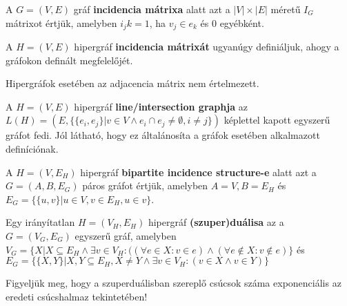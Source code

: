 \begin{definition}
A $G=(V,E)$ gráf \textbf{incidencia mátrixa} alatt azt a $|V| \times |E|$ méretű $I_G$ mátrixot értjük, amelyben $i_jk=1$, ha $v_j \in e_k$ és 0 egyébként.
\end{definition}

\begin{definition}
A $H=(V,E)$ hipergráf \textbf{incidencia mátrixát} ugyanúgy definiáljuk, ahogy a gráfokon definált megfelelőjét.
\end{definition}

\begin{note}
Hipergráfok esetében az adjacencia mátrix nem értelmezett.
\end{note}

\begin{definition}
A $H=(V,E)$ hipergráf \textbf{line/intersection graphja} az $L(H)=(E, \{ \{ e_i, e_j \} | v \in V \land e_i \cap e_j \neq \emptyset, i \neq j \})$ képlettel kapott egyszerű gráfot fedi. Jól látható, hogy ez általánosíta a gráfok esetében alkalmazott definíciónak.
\end{definition}

\begin{definition}
A $H=(V,E_H)$ hipergráf \textbf{bipartite incidence structure-e} alatt azt a $G=(A,B,E_G)$ páros gráfot értjük, amelyben $A=V, B=E_H$ és $E_G=\{\{u,v\} | u \in V, v \in E_H, u \in v \}$.
\end{definition}

\begin{definition}
Egy irányítatlan $H=(V_H,E_H)$ hipergráf \textbf{(szuper)duálisa} az a $G=(V_G,E_G)$ egyszerű gráf, amelyben $V_G=\{X | X \subseteq E_H \land \exists v \in V_H : ((\forall e \in X: v \in e) \land (\forall e \notin X : v \notin e) \}$ és $E_G=\{\{X,Y\} | X,Y \subseteq E_H, X \neq Y \land \exists v \in V_H : (v \in X \land v \in Y)\}$
\end{definition}

\begin{note}
Figyeljük meg, hogy a szuperduálisban szereplő csúcsok száma exponenciális az eredeti csúcshalmaz tekintetében!
\end{note}

